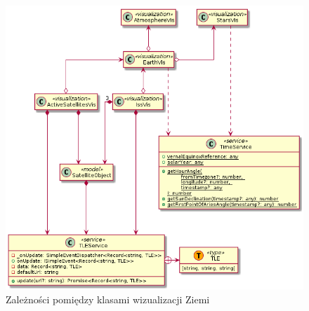 \begin{figure}
  \centering
  \includegraphics[width=\textwidth]{diagrams/out/c4_earthVis.png}
  \caption{Zależności pomiędzy klasami wizualizacji Ziemi}
  \label{fig:c4_earthVis} 
\end{figure}

